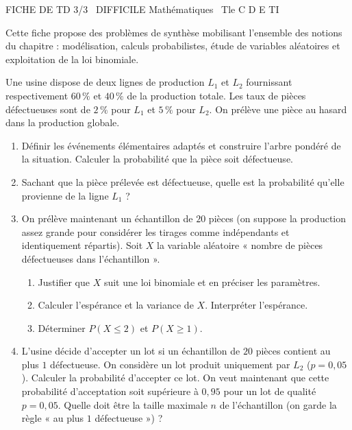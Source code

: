\documentclass[11pt]{article}
\begin{document}
\begin{tcolorbox}[enhanced,colback=popink,colframe=popink,arc=10pt,boxrule=0pt,left=12pt,right=12pt,top=9pt,bottom=9pt]
{\color{white}\popxbold\small FICHE DE TD 3/3 \textbullet\ DIFFICILE \hfill Mathématiques \textbullet\ Tle C D E TI\par}
\end{tcolorbox}
\vspace{4pt}
Cette fiche propose des problèmes de synthèse mobilisant l'ensemble des notions du chapitre : modélisation, calculs probabilistes, étude de variables aléatoires et exploitation de la loi binomiale.

\begin{exercice}
Une usine dispose de deux lignes de production $L_1$ et $L_2$ fournissant respectivement $60\,\%$ et $40\,\%$ de la production totale. Les taux de pièces défectueuses sont de $2\,\%$ pour $L_1$ et $5\,\%$ pour $L_2$. On prélève une pièce au hasard dans la production globale.
\begin{enumerate}
    \item Définir les événements élémentaires adaptés et construire l'arbre pondéré de la situation. Calculer la probabilité que la pièce soit défectueuse.
    \item Sachant que la pièce prélevée est défectueuse, quelle est la probabilité qu'elle provienne de la ligne $L_1$ ?
    \item On prélève maintenant un échantillon de $20$ pièces (on suppose la production assez grande pour considérer les tirages comme indépendants et identiquement répartis). Soit $X$ la variable aléatoire « nombre de pièces défectueuses dans l'échantillon ».
    \begin{enumerate}
        \item Justifier que $X$ suit une loi binomiale et en préciser les paramètres.
        \item Calculer l'espérance et la variance de $X$. Interpréter l'espérance.
        \item Déterminer $P(X \le 2)$ et $P(X \ge 1)$.
    \end{enumerate}
    \item L'usine décide d'accepter un lot si un échantillon de $20$ pièces contient au plus $1$ défectueuse. On considère un lot produit uniquement par $L_2$ ($p=0,05$). Calculer la probabilité d'accepter ce lot. On veut maintenant que cette probabilité d'acceptation soit supérieure à $0,95$ pour un lot de qualité $p=0,05$. Quelle doit être la taille maximale $n$ de l'échantillon (on garde la règle « au plus $1$ défectueuse ») ?
\end{enumerate}
\end{exercice}
\end{document}

